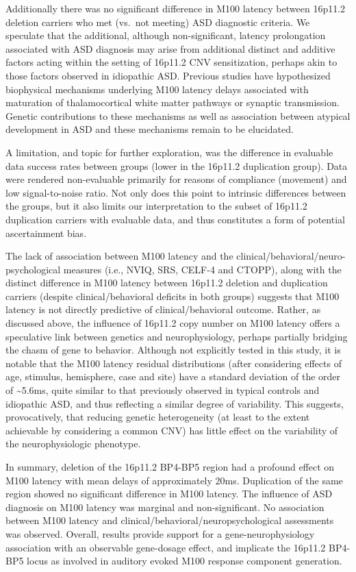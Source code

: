 \documentclass[]{article}
\begin{document}
Additionally there was no significant difference in M100 latency between
16p11.2 deletion carriers who met (vs.~not meeting) ASD diagnostic
criteria. We speculate that the additional, although non-significant,
latency prolongation associated with ASD diagnosis may arise from
additional distinct and additive factors acting within the setting of
16p11.2 CNV sensitization, perhaps akin to those factors observed in
idiopathic ASD. Previous studies have hypothesized biophysical
mechanisms underlying M100 latency delays associated with maturation of
thalamocortical white matter pathways or synaptic transmission. Genetic
contributions to these mechanisms as well as association between
atypical development in ASD and these mechanisms remain to be
elucidated.

A limitation, and topic for further exploration, was the difference in
evaluable data success rates between groups (lower in the 16p11.2
duplication group). Data were rendered non-evaluable primarily for
reasons of compliance (movement) and low signal-to-noise ratio. Not only
does this point to intrinsic differences between the groups, but it also
limits our interpretation to the subset of 16p11.2 duplication carriers
with evaluable data, and thus constitutes a form of potential
ascertainment bias.

The lack of association between M100 latency and the
clinical/behavioral/neuro-psychological measures (i.e., NVIQ, SRS,
CELF-4 and CTOPP), along with the distinct difference in M100 latency
between 16p11.2 deletion and duplication carriers (despite
clinical/behavioral deficits in both groups) suggests that M100 latency
is not directly predictive of clinical/behavioral outcome. Rather, as
discussed above, the influence of 16p11.2 copy number on M100 latency
offers a speculative link between genetics and neurophysiology, perhaps
partially bridging the chasm of gene to behavior. Although not
explicitly tested in this study, it is notable that the M100 latency
residual distributions (after considering effects of age, stimulus,
hemisphere, case and site) have a standard deviation of the order of
\textasciitilde{}5.6ms, quite similar to that previously observed in
typical controls and idiopathic ASD, and thus reflecting a similar
degree of variability. This suggests, provocatively, that reducing
genetic heterogeneity (at least to the extent achievable by considering
a common CNV) has little effect on the variability of the
neurophysiologic phenotype.

In summary, deletion of the 16p11.2 BP4-BP5 region had a profound effect
on M100 latency with mean delays of approximately 20ms. Duplication of
the same region showed no significant difference in M100 latency. The
influence of ASD diagnosis on M100 latency was marginal and
non-significant. No association between M100 latency and
clinical/behavioral/neuropsychological assessments was observed.
Overall, results provide support for a gene-neurophysiology association
with an observable gene-dosage effect, and implicate the 16p11.2 BP4-BP5
locus as involved in auditory evoked M100 response component generation.
\end{document}
